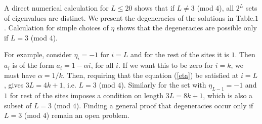 \documentclass[11pt,a4paper]{book}
\begin{document}
A direct numerical calculation for $L\le20$ shows
that if $L\ne3$ (mod $4$), all $2^L$ sets of eigenvalues are
distinct. We present the degeneracies of the solutions in
Table.$1$. Calculation for simple choices of $\eta$ shows that
the degeneracies are possible only if $L=3$ (mod $4$).

For example,
consider $\eta_i=-1$ for $i=L$ and for the rest of the sites it is
$1$.  Then $a_i$ is of the form $a_i=1- \alpha i$, for all $i$. If we 
want this to be zero for $i=k$, we must have $\alpha = 1/k$.  Then, 
requiring that the equation (\ref{eta}) be satisfied at $i=L$, gives   
$3L=4k+1$, i.e. $L=3$ (mod $4$). Similarly for
the set with $\eta_{L-1}=-1$ and $1$ for rest of the sites imposes a
condition on length $3L=8k+1$, which is also a subset of $L=3$ (mod
$4$). Finding a general proof that degeneracies occur only if $L 
=3$ (mod $4$) remain an  open problem.
\end{document}
